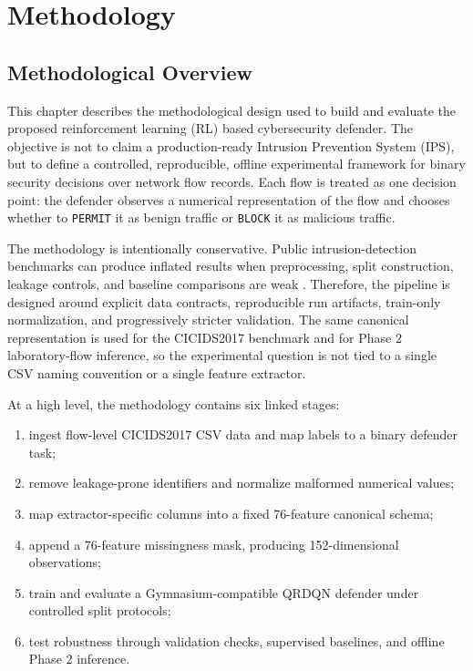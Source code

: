 \chapter{Methodology}

\section{Methodological Overview}
This chapter describes the methodological design used to build and evaluate the proposed reinforcement learning (RL) based cybersecurity defender. The objective is not to claim a production-ready Intrusion Prevention System (IPS), but to define a controlled, reproducible, offline experimental framework for binary security decisions over network flow records. Each flow is treated as one decision point: the defender observes a numerical representation of the flow and chooses whether to \texttt{PERMIT} it as benign traffic or \texttt{BLOCK} it as malicious traffic.

The methodology is intentionally conservative. Public intrusion-detection benchmarks can produce inflated results when preprocessing, split construction, leakage controls, and baseline comparisons are weak \parencite{Arp2020DosDontsMLSecurity,Engelen2021CICIDSIssues,Lanvin2023Errors}. Therefore, the pipeline is designed around explicit data contracts, reproducible run artifacts, train-only normalization, and progressively stricter validation. The same canonical representation is used for the CICIDS2017 benchmark and for Phase 2 laboratory-flow inference, so the experimental question is not tied to a single CSV naming convention or a single feature extractor.

At a high level, the methodology contains six linked stages:
\begin{enumerate}
    \item ingest flow-level CICIDS2017 CSV data and map labels to a binary defender task;
    \item remove leakage-prone identifiers and normalize malformed numerical values;
    \item map extractor-specific columns into a fixed 76-feature canonical schema;
    \item append a 76-feature missingness mask, producing 152-dimensional observations;
    \item train and evaluate a Gymnasium-compatible QRDQN defender under controlled split protocols;
    \item test robustness through validation checks, supervised baselines, and offline Phase 2 inference.
\end{enumerate}

